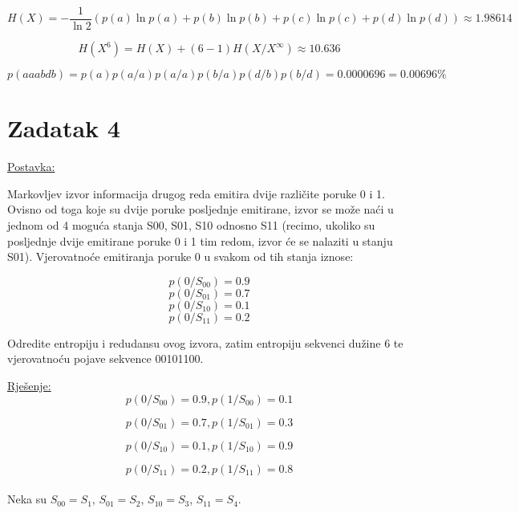 \documentclass[12pt]{article}
\begin{document}
$$H(X) = - \frac{1}{\ln{2}} (p(a) \ln{p(a)} + p(b) \ln{p(b)} + p(c) \ln{p(c)} + p(d) \ln{p(d)}) \approx 1.98614$$

$$H(X^6) = H(X) + (6 - 1) H(X / X^{\infty}) \approx 10.636$$

$$p(aaabdb) = p(a) p(a/a) p(a/a) p(b/a) p(d/b) p(b/d) = 0.0000696 = 0.00696\%$$


\newpage

\section*{Zadatak 4\label{Z4}}

\underline{Postavka:}

Markovljev izvor informacija drugog reda emitira dvije različite poruke 0 i 1. Ovisno od toga koje su dvije poruke posljednje emitirane, izvor se može naći u jednom od 4 moguća stanja S00, S01, S10 odnosno S11 (recimo, ukoliko su posljednje dvije emitirane poruke 0 i 1 tim redom, izvor će se nalaziti u stanju S01). Vjerovatnoće emitiranja poruke 0 u svakom od tih stanja iznose:

$$p(0/S_{00}) = 0.9$$
$$p(0/S_{01}) = 0.7$$
$$p(0/S_{10}) = 0.1$$
$$p(0/S_{11}) = 0.2$$

Odredite entropiju i redudansu ovog izvora, zatim entropiju sekvenci dužine 6 te vjerovatnoću pojave sekvence 00101100.

\underline{Rješenje:}\\

$$p(0/S_{00}) = 0.9, p(1/S_{00}) = 0.1$$

$$p(0/S_{01}) = 0.7, p(1/S_{01}) = 0.3$$

$$p(0/S_{10}) = 0.1, p(1/S_{10}) = 0.9$$

$$p(0/S_{11}) = 0.2, p(1/S_{11}) = 0.8$$\\

Neka su $S_{00} = S_1$, $S_{01} = S_2$, $S_{10} = S_3$, $S_{11} = S_4$.
\end{document}
